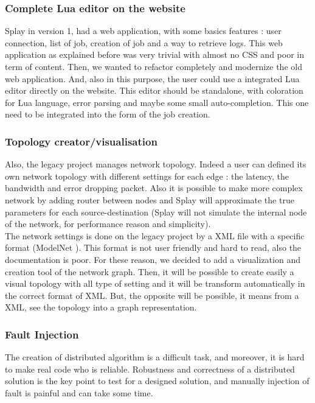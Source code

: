 \documentclass{eplmastersthesis}
\begin{document}
\subsubsection{Complete Lua editor on the website}

Splay in version 1, had a web application, with some basics features : user connection, list of job, creation of job and a way to retrieve logs. This web application as explained before was very trivial with almost no CSS and poor in term of content. Then, we wanted to refactor completely and modernize the old web application. And, also in this purpose, the user could use a integrated Lua editor directly on the website. This editor should be standalone, with coloration for Lua language, error parsing and maybe some small auto-completion. This one need to be integrated into the form of the job creation.

\subsubsection{Topology creator/visualisation}

Also, the legacy project manages network topology. Indeed a user can defined its own network topology with different settings for each edge : the latency, the bandwidth and error dropping packet. Also it is possible to make more complex network by adding router between nodes and Splay will approximate the true parameters for each source-destination (Splay will not simulate the internal node of the network, for performance reason and simplicity). \\

The network settings is done on the legacy project by a XML file with a specific format (ModelNet \cite{ModelNet}). This format is not user friendly and hard to read, also the documentation is poor. For these reason, we decided to add a visualization and creation tool of the network graph. Then, it will be possible to create easily a visual topology with all type of setting and it will be transform automatically in the correct format of XML. But, the opposite will be possible, it means from a XML, see the topology into a graph representation.

\subsubsection{Fault Injection}

The creation of distributed algorithm is a difficult task, and moreover, it is hard to make real code who is reliable. Robustness and correctness of a distributed solution is the key point to test for a designed solution, and manually injection of fault is painful and can take some time. \\
\end{document}
